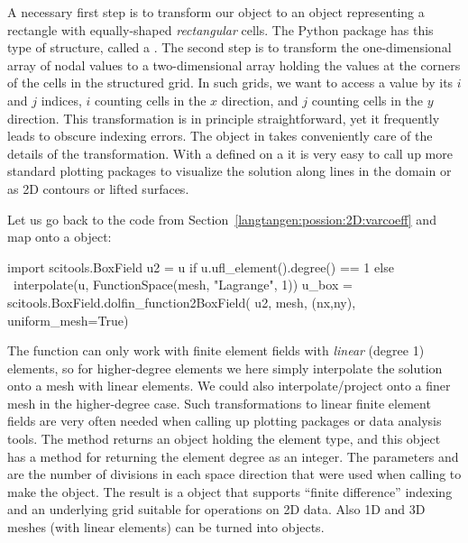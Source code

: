 A necessary first step is to transform our
 object to an object representing
a rectangle with equally-shaped \emph{rectangular} cells.  The Python
package  has this type of
structure, called a
. The second step is to
transform the one-dimensional array of nodal values to a
two-dimensional array holding the values at the corners of the cells
in the structured grid. In such grids, we want to access a value by
its $i$ and $j$ indices, $i$ counting cells in the $x$ direction, and
$j$ counting cells in the $y$ direction.  This transformation is in
principle straightforward, yet it frequently leads to obscure indexing
errors. The  object in
 takes conveniently care of
the details of the transformation.  With a
 defined on a
 it is very easy to call
up more standard plotting packages to visualize the solution along
lines in the domain or as 2D contours or lifted surfaces.

Let us go back to the  code from
Section~\ref{langtangen:possion:2D:varcoeff} and map  onto a
 object:
\begin{python}
import scitools.BoxField
u2 = u if u.ufl_element().degree() == 1 else \
     interpolate(u, FunctionSpace(mesh, "Lagrange", 1))
u_box = scitools.BoxField.dolfin_function2BoxField(
        u2, mesh, (nx,ny), uniform_mesh=True)
\end{python}
The function
 can only work
with finite element fields with \emph{linear} (degree 1) elements, so
for higher-degree elements we here simply interpolate the solution
onto a mesh with linear elements. We could also
interpolate/project onto a finer
mesh in the higher-degree case.  Such transformations to linear finite
element fields are very often needed when calling up plotting packages
or data analysis tools.  The
 method returns an object
holding the element type, and this object has a method
 for returning the element
degree as an integer.  The parameters
 and
 are the number of divisions in each
space direction that were used when calling
 to make the
 object.  The result
 is a
 object that supports ``finite
difference'' indexing and an underlying grid suitable for
 operations on 2D data.  Also 1D
and 3D meshes (with linear elements) can be turned
into  objects.

